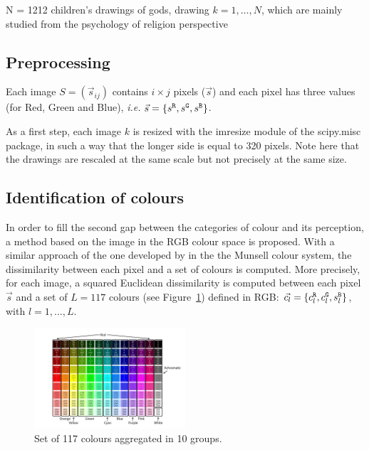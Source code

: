 \documentclass[11pt,a4paper]{article}
\begin{document}
N = 1212 children's drawings of gods, drawing
$k = 1,\dots, N$, which are mainly studied from the psychology of
religion perspective %

\subsection{Preprocessing}
Each image $S = (\vec{s}_{ij})$ contains $i \times j$
pixels ($\vec{s}$) and each pixel has three values (for Red, Green and Blue), \textit{i.e.}
$\vec{s} = \{ s^{\tt \scriptstyle R}, s^{\tt \scriptstyle G}, s^{\tt \scriptstyle B} \}$.

As a first step, each image $k$ is resized with the imresize
module of the scipy.misc package, in such a way that the longer side is
equal to 320 pixels. Note here that the drawings are
rescaled at the same scale but not precisely at the same size.


\subsection{Identification of colours}





In order to fill the second gap between the categories of colour and its
perception, a method based on the image in the RGB colour space is
proposed. With a similar approach of the one developed by
\cite{kimbaelee2007} in the the Munsell colour system, the dissimilarity
between each pixel and a set of colours is computed. More precisely, for
each image, a squared Euclidean dissimilarity is computed between each
pixel \(\vec{s}\) and a set of $L = 117$ colours (see Figure~\ref{colour_set}) defined in RGB:
\(\vec{c_l} = \{ c^{\tt \scriptstyle R}_{l}, c^{\tt \scriptstyle G}_{l}, s^{\tt \scriptstyle B}_{l} \}\),
with $l = 1, ..., L$.

\begin{figure}
	\centering
	\includegraphics[width=0.5\textwidth]{figures/Col_tab.pdf}
	\caption{Set of 117 colours aggregated in 10 groups. \label{colour_set}}
\end{figure}
\end{document}
